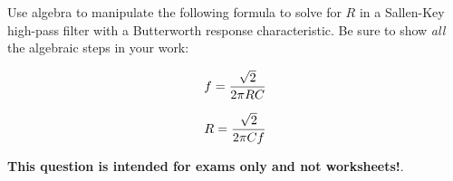 

Use algebra to manipulate the following formula to solve for $R$ in a Sallen-Key high-pass filter with a Butterworth response characteristic.  Be sure to show {\it all} the algebraic steps in your work:

$$f = {\sqrt{2} \over {2 \pi R C}}$$







$$R = {\sqrt{2} \over {2 \pi C f}}$$







{\bf This question is intended for exams only and not worksheets!}.



